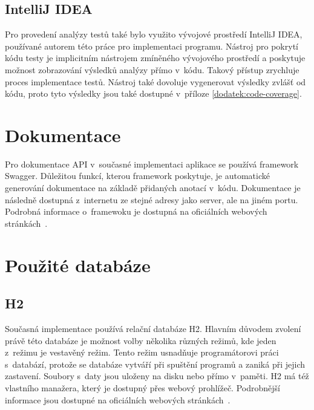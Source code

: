     \subsection{IntelliJ IDEA}\label{resere:testovani:intellij-idea}
        Pro provedení analýzy testů také bylo využito vývojové prostředí IntelliJ IDEA, používané autorem této práce pro implementaci programu. Nástroj pro pokrytí kódu testy je implicitním nástrojem zmíněného vývojového prostředí a poskytuje možnost zobrazování výsledků analýzy přímo v~kódu. Takový přístup zrychluje proces implementace testů. Nástroj také dovoluje vygenerovat výsledky zvlášť od kódu, proto tyto výsledky jsou také dostupné v~příloze \ref{dodatek:code-coverage}.


\section{Dokumentace}\label{resere:dokumentace}
    Pro dokumentace API v~současné implementaci aplikace se používá framework Swagger. Důležitou funkcí, kterou framework poskytuje, je automatické generování dokumentace na základě přidaných anotací v~kódu. Dokumentace je následně dostupná z~internetu ze stejné adresy jako server, ale na jiném portu. Podrobná informace o~framewoku je dostupná na oficiálních webových stránkách~\cite{swagger-doc}.
    
\section{Použité databáze}\label{resere:databaze}

    \subsection{H2}
        Současná implementace používá relační databáze H2. Hlavním důvodem zvolení právě této databáze je možnost volby několika různých režimů, kde jeden z~režimu je vestavěný režim. Tento režim usnadňuje programátorovi práci s~databází, protože se databáze vytváří při spuštění programů a zaniká při jejich zastavení. Soubory s~daty jsou uloženy na disku nebo přímo v~paměti. H2 má též vlastního manažera, který je dostupný přes webový prohlížeč. Podrobnější informace jsou dostupné na oficiálních webových stránkách~\cite{h2-doc}.
        
